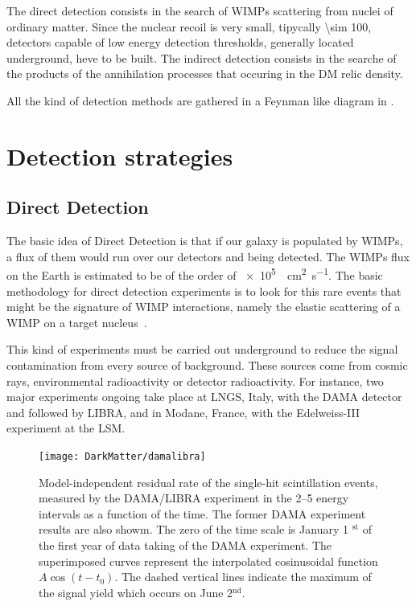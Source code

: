 The direct detection consists in the search of WIMPs scattering from nuclei of ordinary matter. Since the nuclear recoil is very small, tipycally \SI{\sim 100}{\kev}, detectors capable of low energy detection thresholds, generally located underground, heve to be built. The indirect detection consists in the searche of the products of the annihilation processes that occuring in the DM relic density.

All the kind of detection methods are gathered in a Feynman like diagram in \Fig{\ref{fig:detection}}.

\section{Detection strategies}

\subsection{Direct Detection}
The basic idea of Direct Detection is that if our galaxy is populated by WIMPs, a flux of them would run over our detectors and being detected. The WIMPs flux on the Earth is estimated to be of the order of \SI{e5}{\per \cm\squared\per\s}. The basic methodology for direct detection experiments is to look for this rare events that might be the signature of WIMP interactions, namely the elastic scattering of a WIMP on a target nucleus~\cite{snowmass}.

This kind of experiments must be carried out underground to reduce the signal contamination from every source of background. These sources come from cosmic rays, environmental radioactivity or detector radioactivity. For instance, two major experiments ongoing take place at LNGS, Italy, with the DAMA detector and followed by LIBRA, and in Modane, France, with the Edelweiss-III experiment at the LSM.
\begin{figure}[t]
\centering
\texttt{[image: DarkMatter/damalibra]}
\caption{Model-independent residual rate of the single-hit scintillation events, measured by the DAMA/LIBRA experiment in the \SIrange{2}{5}{\kev} energy intervals as a function of the time. The former DAMA experiment results are also showm. The zero of the time scale is January 1 $^{\text{st}}$ of the first year of data taking of the DAMA experiment. The superimposed curves represent the interpolated cosinusoidal function $A\cos{(t-t_0)}$. The dashed vertical lines indicate the maximum of the signal yield which occurs on June 2$^{\text{nd}}$.}

\label{fig:damalibra}
\end{figure}

